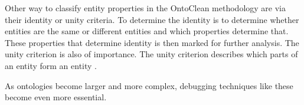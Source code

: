 \documentclass[12pt,a4paper]{article}
\begin{document}
Other way to classify entity properties in the OntoClean methodology are via their identity or unity criteria. To determine the identity is to determine whether entities are the same or different entities and which properties determine that. These properties that determine identity is then marked for further analysis. The unity criterion is also of importance. The unity criterion describes which parts of an entity form an entity \citep{Guarino2009}.
    
As ontologies become larger and more complex, debugging techniques like these become even more essential.







\end{document}
